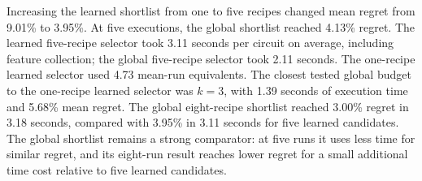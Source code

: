 Increasing the learned shortlist from one to five recipes changed mean regret from 9.01\% to 3.95\%. At five executions, the global shortlist reached 4.13\% regret. The learned five-recipe selector took 3.11 seconds per circuit on average, including feature collection; the global five-recipe selector took 2.11 seconds. The one-recipe learned selector used 4.73 mean-run equivalents. The closest tested global budget to the one-recipe learned selector was $k=3$, with 1.39 seconds of execution time and 5.68\% mean regret. The global eight-recipe shortlist reached 3.00\% regret in 3.18 seconds, compared with 3.95\% in 3.11 seconds for five learned candidates. The global shortlist remains a strong comparator: at five runs it uses less time for similar regret, and its eight-run result reaches lower regret for a small additional time cost relative to five learned candidates.
